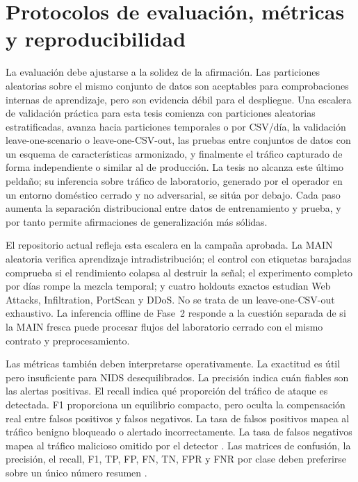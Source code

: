 \section{Protocolos de evaluación, métricas y reproducibilidad}

La evaluación debe ajustarse a la solidez de la afirmación. Las particiones aleatorias sobre el mismo conjunto de datos son aceptables para comprobaciones internas de aprendizaje, pero son evidencia débil para el despliegue. Una escalera de validación práctica para esta tesis comienza con particiones aleatorias estratificadas, avanza hacia particiones temporales o por CSV/día, la validación leave-one-scenario o leave-one-CSV-out, las pruebas entre conjuntos de datos con un esquema de características armonizado, y finalmente el tráfico capturado de forma independiente o similar al de producción. La tesis no alcanza este último peldaño; su inferencia sobre tráfico de laboratorio, generado por el operador en un entorno doméstico cerrado y no adversarial, se sitúa por debajo. Cada paso aumenta la separación distribucional entre datos de entrenamiento y prueba, y por tanto permite afirmaciones de generalización más sólidas.

El repositorio actual refleja esta escalera en la campaña aprobada. La MAIN aleatoria verifica aprendizaje intradistribución; el control con etiquetas barajadas comprueba si el rendimiento colapsa al destruir la señal; el experimento completo por días rompe la mezcla temporal; y cuatro holdouts exactos estudian Web Attacks, Infiltration, PortScan y DDoS. No se trata de un leave-one-CSV-out exhaustivo. La inferencia offline de Fase~2 responde a la cuestión separada de si la MAIN fresca puede procesar flujos del laboratorio cerrado con el mismo contrato y preprocesamiento.

Las métricas también deben interpretarse operativamente. La exactitud es útil pero insuficiente para NIDS desequilibrados. La precisión indica cuán fiables son las alertas positivas. El recall indica qué proporción del tráfico de ataque es detectada. F1 proporciona un equilibrio compacto, pero oculta la compensación real entre falsos positivos y falsos negativos. La tasa de falsos positivos mapea al tráfico benigno bloqueado o alertado incorrectamente. La tasa de falsos negativos mapea al tráfico malicioso omitido por el detector \parencite{Axelsson1999BaseRate,Fawcett2006ROC,Saito2015PRROC}. Las matrices de confusión, la precisión, el recall, F1, TP, FP, FN, TN, FPR y FNR por clase deben preferirse sobre un único número resumen \parencite{Milenkoski2015IDSEvaluationSurvey}.

